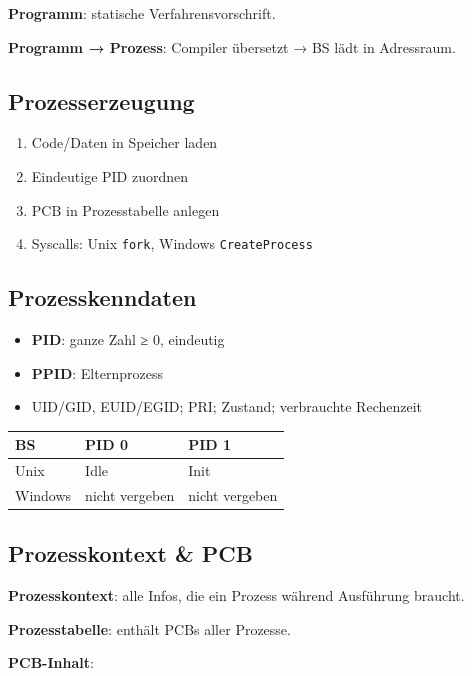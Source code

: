 \documentclass[11pt, a4paper]{article}
\begin{document}
\textbf{Programm}: statische Verfahrensvorschrift.


\textbf{Programm → Prozess}: Compiler übersetzt → BS lädt in Adressraum.



\subsection{Prozesserzeugung}
\begin{enumerate}
  \item Code/Daten in Speicher laden
  \item Eindeutige PID zuordnen
  \item PCB in Prozesstabelle anlegen
  \item Syscalls: Unix \texttt{fork}, Windows \texttt{CreateProcess}
\end{enumerate}


\subsection{Prozesskenndaten}
\begin{itemize}
  \item \textbf{PID}: ganze Zahl ≥ 0, eindeutig
  \item \textbf{PPID}: Elternprozess
  \item UID/GID, EUID/EGID; PRI; Zustand; verbrauchte Rechenzeit
\end{itemize}


{\small
\begin{tabularx}{\linewidth}{XXX}
\hline
\rowcolor{tableheadbg}
{\color{white}\textbf{BS}} & {\color{white}\textbf{PID 0}} & {\color{white}\textbf{PID 1}} \\[2pt]
\hline
\endhead
\hline
\endfoot
Unix & Idle & Init \\
Windows & nicht vergeben & nicht vergeben \\
\end{tabularx}
}



\subsection{Prozesskontext \& PCB}

\textbf{Prozesskontext}: alle Infos, die ein Prozess während Ausführung braucht.


\textbf{Prozesstabelle}: enthält PCBs aller Prozesse.


\textbf{PCB-Inhalt}:
\end{document}
